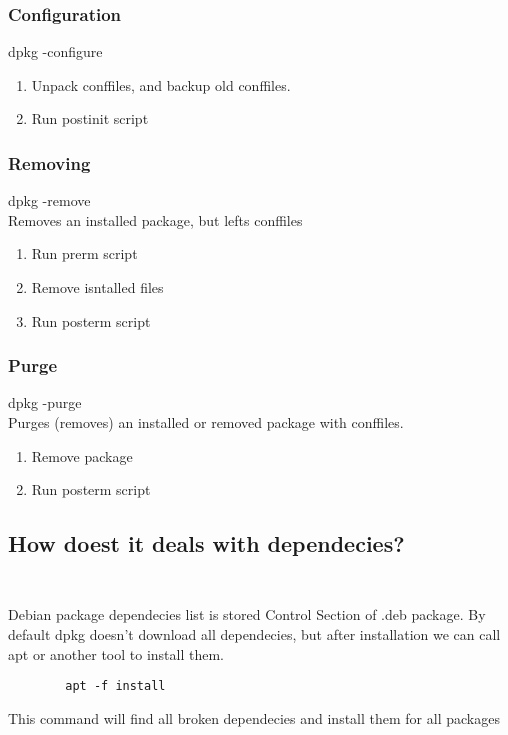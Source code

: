 \documentclass[10pt]{article}
\begin{document}
        \subsubsection*{Configuration}
        dpkg -configure
        \begin{enumerate}[label=\arabic*,ref=\theenumi]
            \item Unpack conffiles, and backup old conffiles.
            \item Run postinit script
        \end{enumerate}

        \subsubsection*{Removing}
        dpkg -remove \\
        Removes an installed package, but lefts conffiles
        \begin{enumerate}[label=\arabic*,ref=\theenumi]
            \item Run prerm script
            \item Remove isntalled files
            \item Run posterm script
        \end{enumerate}

        \subsubsection*{Purge}
        dpkg -purge \\
        Purges (removes) an installed or removed package with conffiles.
        \begin{enumerate}[label=\arabic*,ref=\theenumi]
            \item Remove package
            \item Run posterm script
        \end{enumerate}

    \subsection {How doest it deals with dependecies? \\ \\}
    Debian package dependecies list is stored Control Section of .deb package.
    By default dpkg doesn't download all dependecies, but after installation we can call apt or another tool to install them.
    \begin{verbatim}
        apt -f install
    \end{verbatim}
    This command will find all broken dependecies and install them for all packages
\end{document}

